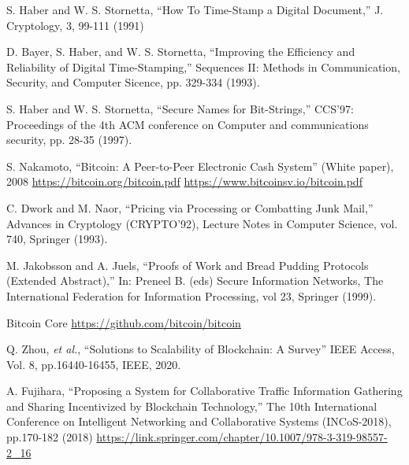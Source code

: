 \documentclass[graybox]{svmult}
\begin{document}
\begin{thebibliography}{99}

  S. Haber and W. S. Stornetta, 
  ``How To Time-Stamp a Digital Document,''
  J. Cryptology, 3, 99-111 (1991)

  D. Bayer, S. Haber, and W. S. Stornetta,
  ``Improving the Efficiency and Reliability of Digital Time-Stamping,''
  Sequences II: Methods in Communication, Security, and Computer Sicence, 
  pp. 329-334 (1993).

  S. Haber and W. S. Stornetta, 
  ``Secure Names for Bit-Strings,''
  CCS'97: Proceedings of the 4th ACM conference on Computer and 
  communications security, pp. 28-35 (1997).


  S. Nakamoto, 
  ``Bitcoin: A Peer-to-Peer Electronic Cash System''
  (White paper), 2008 
  \url{https://bitcoin.org/bitcoin.pdf}
  \url{https://www.bitcoinsv.io/bitcoin.pdf}


  C. Dwork and M. Naor, 
  ``Pricing via Processing or Combatting Junk Mail,''
  Advances in Cryptology (CRYPTO'92), 
  Lecture Notes in Computer Science, vol. 740, Springer (1993). 


  M. Jakobsson and A. Juels, 
  ``Proofs of Work and Bread Pudding Protocols (Extended Abstract),''
  In: Preneel B. (eds) Secure Information Networks, 
  The International Federation for Information Processing, 
  vol 23, Springer (1999).


  Bitcoin Core 
  \url{https://github.com/bitcoin/bitcoin}


  Q. Zhou, \textit{et al.}, 
  ``Solutions to Scalability of Blockchain: A Survey''
  IEEE Access, Vol. 8, pp.16440-16455, IEEE, 2020. 


  A. Fujihara,
  ``Proposing a System for Collaborative Traffic Information Gathering and 
  Sharing Incentivized by Blockchain Technology,''
  The 10th International Conference on Intelligent Networking and 
  Collaborative Systems (INCoS-2018), pp.170-182 (2018)
  \url{https://link.springer.com/chapter/10.1007/978-3-319-98557-2_16}


\end{thebibliography}
\end{document}
